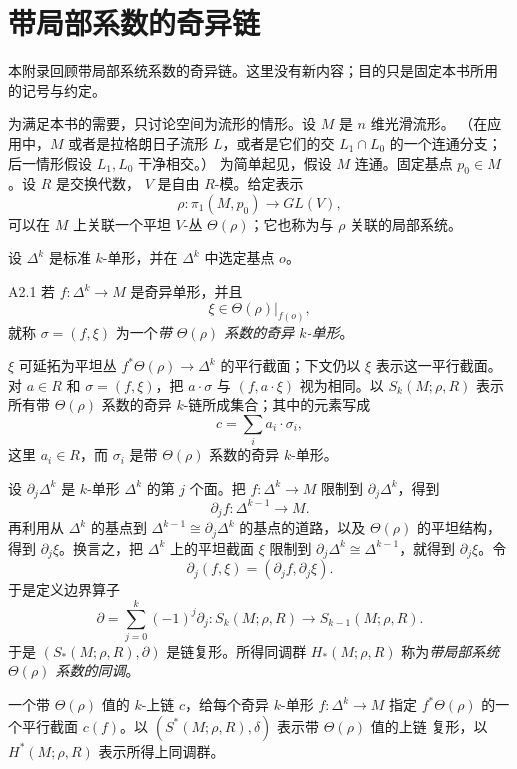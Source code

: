 
\chapter{带局部系数的奇异链}
\label{app:a2}

本附录回顾带局部系统系数的奇异链。这里没有新内容；目的只是固定本书所用
的记号与约定。

为满足本书的需要，只讨论空间为流形的情形。设 $M$ 是 $n$ 维光滑流形。
（在应用中，$M$ 或者是拉格朗日子流形 $L$，或者是它们的交
$L_1\cap L_0$ 的一个连通分支；后一情形假设 $L_1,L_0$ 干净相交。）
为简单起见，假设 $M$ 连通。固定基点 $p_0\in M$。设 $R$ 是交换代数，
$V$ 是自由 $R$-模。给定表示
\[
 \rho\colon\pi_1(M,p_0)\longrightarrow GL(V),
\]
可以在 $M$ 上关联一个平坦 $V$-丛 $\Theta(\rho)$；它也称为与 $\rho$
关联的局部系统。

设 $\Delta^k$ 是标准 $k$-单形，并在 $\Delta^k$ 中选定基点 $o$。

\begin{definition}{A2.1}\label{def:a2-1}
若 $f\colon\Delta^k\to M$ 是奇异单形，并且
\[
 \xi\in\left.\Theta(\rho)\right|_{f(o)},
\]
就称 $\sigma=(f,\xi)$ 为一个\emph{带 $\Theta(\rho)$ 系数的奇异
$k$-单形}。
\end{definition}

$\xi$ 可延拓为平坦丛 $f^*\Theta(\rho)\to\Delta^k$ 的平行截面；下文仍以
$\xi$ 表示这一平行截面。对 $a\in R$ 和 $\sigma=(f,\xi)$，把
$a\cdot\sigma$ 与 $(f,a\cdot\xi)$ 视为相同。以 $S_k(M;\rho,R)$ 表示
所有带 $\Theta(\rho)$ 系数的奇异 $k$-链所成集合；其中的元素写成
\[
 c=\sum_i a_i\cdot\sigma_i,
\]
这里 $a_i\in R$，而 $\sigma_i$ 是带 $\Theta(\rho)$ 系数的奇异
$k$-单形。

设 $\partial_j\Delta^k$ 是 $k$-单形 $\Delta^k$ 的第 $j$ 个面。把
$f\colon\Delta^k\to M$ 限制到 $\partial_j\Delta^k$，得到
\[
 \partial_jf\colon\Delta^{k-1}\longrightarrow M.
\]
再利用从 $\Delta^k$ 的基点到
$\Delta^{k-1}\cong\partial_j\Delta^k$ 的基点的道路，以及
$\Theta(\rho)$ 的平坦结构，得到 $\partial_j\xi$。换言之，把
$\Delta^k$ 上的平坦截面 $\xi$ 限制到
$\partial_j\Delta^k\cong\Delta^{k-1}$，就得到 $\partial_j\xi$。令
\[
 \partial_j(f,\xi)=(\partial_jf,\partial_j\xi).
\]
于是定义边界算子
\[
 \partial=\sum_{j=0}^k(-1)^j\partial_j
 \colon S_k(M;\rho,R)\longrightarrow S_{k-1}(M;\rho,R).
\]
于是 $(S_*(M;\rho,R),\partial)$ 是链复形。所得同调群
$H_*(M;\rho,R)$ 称为\emph{带局部系统 $\Theta(\rho)$ 系数的同调}。

一个带 $\Theta(\rho)$ 值的 $k$-上链 $c$，给每个奇异 $k$-单形
$f\colon\Delta^k\to M$ 指定 $f^*\Theta(\rho)$ 的一个平行截面
$c(f)$。以 $(S^*(M;\rho,R),\delta)$ 表示带 $\Theta(\rho)$ 值的上链
复形，以 $H^*(M;\rho,R)$ 表示所得上同调群。

